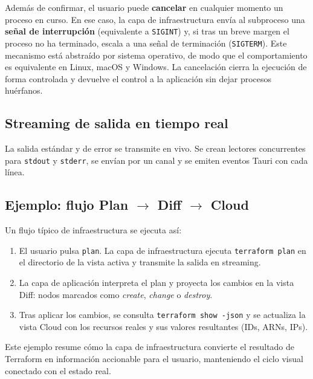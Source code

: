 \documentclass{article}
\begin{document}
{        \justify
        Además de confirmar, el usuario puede \textbf{cancelar} en cualquier
        momento un proceso en curso. En ese caso, la capa de infraestructura
        envía al subproceso una \textbf{señal de interrupción} (equivalente a
        \texttt{SIGINT}) y, si tras un breve margen el proceso no ha terminado,
        escala a una señal de terminación (\texttt{SIGTERM}). Este mecanismo
        está abstraído por sistema operativo, de modo que el comportamiento es
        equivalente en Linux, macOS y Windows. La cancelación cierra la
        ejecución de forma controlada y devuelve el control a la aplicación sin
        dejar procesos huérfanos.

        \subsection{Streaming de salida en tiempo real}
        \justify
        La salida estándar y de error se transmite en vivo. Se crean lectores
        concurrentes para \texttt{stdout} y \texttt{stderr}, se envían por un canal y
        se emiten eventos Tauri con cada línea.

        \subsection{Ejemplo: flujo Plan $\rightarrow$ Diff $\rightarrow$ Cloud}
        \justify
        Un flujo típico de infraestructura se ejecuta así:
        \begin{enumerate}
            \item El usuario pulsa \texttt{plan}. La capa de infraestructura ejecuta
            \texttt{terraform plan} en el directorio de la vista activa y transmite
            la salida en streaming.
            \item La capa de aplicación interpreta el plan y proyecta los cambios en
            la vista Diff: nodos marcados como \textit{create}, \textit{change} o
            \textit{destroy}.
            \item Tras aplicar los cambios, se consulta \texttt{terraform show -json}
            y se actualiza la vista Cloud con los recursos reales y sus valores
            resultantes (IDs, ARNs, IPs).
        \end{enumerate}

        \justify
        Este ejemplo resume cómo la capa de infraestructura convierte el resultado
        de Terraform en información accionable para el usuario, manteniendo el
        ciclo visual conectado con el estado real.

}
\end{document}
